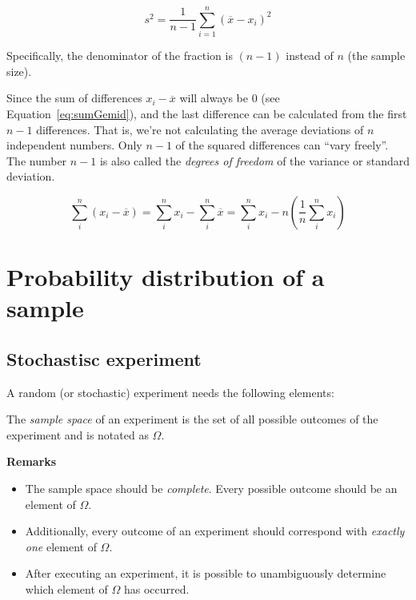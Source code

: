 \begin{equation}
  \label{eq:sample-variance}
  s^2 = \frac{1}{n-1} \sum_{i=1}^{n} (\overline{x} - x_i)^{2}
\end{equation}

Specifically, the denominator of the fraction is $(n-1)$ instead of $n$ (the sample size). 

Since the sum of differences $x_{i} - \overline{x}$ will always be 0 (see Equation~\ref{eq:sumGemid}), and the last difference can be calculated from the first $n-1$ differences. That is, we're not calculating the average deviations of $n$ independent numbers. Only $n-1$ of the squared differences can ``vary freely''. The number $n-1$ is also called the \emph{degrees of freedom} of the variance or standard deviation.

\begin{equation}
 \sum_{i}^{n}(x_{i} - \overline{x}) = \sum_{i}^{n}x_{i} - \sum_{i}^{n}\overline{x} = \sum_{i}^{n}x_{i} - n (\frac{1}{n}\sum_{i}^{n} x_{i})
\label{eq:sumGemid}
\end{equation}

\section{Probability distribution of a sample}
\label{sec:sample-probability-distribution}

\subsection{Stochastisc experiment}

A random (or stochastic) experiment needs the following elements:

\begin{definition} The \emph{sample space} of an experiment is the set of all possible outcomes of the experiment and is notated as $\Omega$.
\end{definition}

\textbf{Remarks}
\begin{itemize}
\item The sample space should be \emph{complete}. Every possible outcome should be an element of $\Omega$.
\item Additionally, every outcome of an experiment should correspond with \emph{exactly one} element of $\Omega$.
\item After executing an experiment, it is possible to unambiguously determine which element of $\Omega$ has occurred.
\end{itemize}

